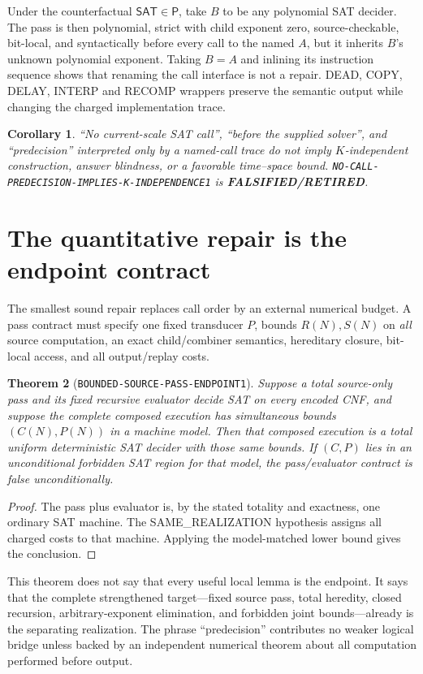 \documentclass[11pt]{article}
\newtheorem{theorem}{Theorem}
\newtheorem{corollary}[theorem]{Corollary}
\newcommand{\SAT}{\mathsf{SAT}}
\newcommand{\RETIRED}{\textbf{FALSIFIED/RETIRED}}
\begin{document}
Under the counterfactual $\SAT\in\mathsf P$, take $B$ to be any polynomial
SAT decider.  The pass is then polynomial, strict with child exponent zero,
source-checkable, bit-local, and syntactically before every call to the named
$A$, but it inherits $B$'s unknown polynomial exponent.  Taking $B=A$ and
inlining its instruction sequence shows that renaming the call interface is
not a repair.  DEAD, COPY, DELAY, INTERP and RECOMP wrappers preserve the
semantic output while changing the charged implementation trace.

\begin{corollary}
``No current-scale SAT call'', ``before the supplied solver'', and
``predecision'' interpreted only by a named-call trace do not imply
$K$-independent construction, answer blindness, or a favorable time--space
bound.  \texttt{NO-CALL-PREDECISION-IMPLIES-K-INDEPENDENCE1} is
\RETIRED.
\end{corollary}

\section{The quantitative repair is the endpoint contract}

The smallest sound repair replaces call order by an external numerical
budget.  A pass contract must specify one fixed transducer $P$, bounds
$R(N),S(N)$ on \emph{all} source computation, an exact child/combiner
semantics, hereditary closure, bit-local access, and all output/replay costs.

\begin{theorem}[\texttt{BOUNDED-SOURCE-PASS-ENDPOINT1}]
Suppose a total source-only pass and its fixed recursive evaluator decide SAT
on every encoded CNF, and suppose the complete composed execution has
simultaneous bounds $(C(N),P(N))$ in a machine model.  Then that composed
execution is a total uniform deterministic SAT decider with those same
bounds.  If $(C,P)$ lies in an unconditional forbidden SAT region for that
model, the pass/evaluator contract is false unconditionally.
\end{theorem}

\begin{proof}
The pass plus evaluator is, by the stated totality and exactness, one ordinary
SAT machine.  The SAME\_REALIZATION hypothesis assigns all charged costs to
that machine.  Applying the model-matched lower bound gives the conclusion.
\end{proof}

This theorem does not say that every useful local lemma is the endpoint.  It
says that the complete strengthened target---fixed source pass, total
heredity, closed recursion, arbitrary-exponent elimination, and forbidden
joint bounds---already is the separating realization.  The phrase
``predecision'' contributes no weaker logical bridge unless backed by an
independent numerical theorem about all computation performed before output.
\end{document}

